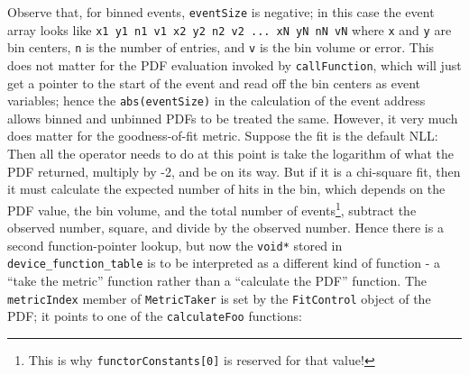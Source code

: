 \documentclass[12pt,pdflatex]{article}
\begin{document}
Observe that, for binned events, \texttt{eventSize} is negative; in this case
the event array looks like \verb|x1 y1 n1 v1 x2 y2 n2 v2 ... xN yN nN vN| where
\texttt{x} and \texttt{y} are bin centers, \texttt{n} is the number of entries, 
and \texttt{v} is the bin volume or error. This does not matter for the PDF evaluation
invoked by \texttt{callFunction}, which will just get a pointer to the start of
the event and read off the bin centers as event variables; hence the \verb|abs(eventSize)|
in the calculation of the event address allows binned and unbinned PDFs to be 
treated the same. However, it very much does matter for the goodness-of-fit metric.
Suppose the fit is the default NLL: Then all the operator needs to do at this
point is take the logarithm of what the PDF returned, multiply by -2, and be
on its way. But if it is a chi-square fit, then it must calculate the expected
number of hits in the bin, which depends on the PDF value, the bin volume,
and the total number of events\footnote{This is why \texttt{functorConstants[0]} is reserved for that value!},
subtract the observed number, square, and divide by the observed
number. Hence there is a second function-pointer lookup, but now the \verb|void*|
stored in \verb|device_function_table| is to be interpreted as a different kind
of function - a ``take the metric'' function rather than a ``calculate the PDF''
function. The \verb|metricIndex| member of \verb|MetricTaker| is set by the \texttt{FitControl}
object of the PDF; it points to one of the \texttt{calculateFoo} functions:
\end{document}
